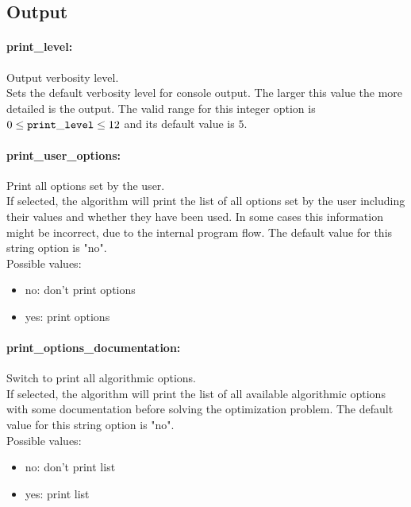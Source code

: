 \subsection{Output}

\paragraph{print\_level:}\label{sec:print_level} Output verbosity level. $\;$ \\
 Sets the default verbosity level for console
output. The larger this value the more detailed
is the output. The valid range for this integer option is
$0 \le {\tt print\_level } \le 12$
and its default value is $5$.


\paragraph{print\_user\_options:}\label{sec:print_user_options} Print all options set by the user. $\;$ \\
 If selected, the algorithm will print the list of
all options set by the user including their
values and whether they have been used.  In some
cases this information might be incorrect, due to
the internal program flow.
The default value for this string option is "no".
\\ 
Possible values:
\begin{itemize}
   \item no: don't print options
   \item yes: print options
\end{itemize}

\paragraph{print\_options\_documentation:}\label{sec:print_options_documentation} Switch to print all algorithmic options. $\;$ \\
 If selected, the algorithm will print the list of
all available algorithmic options with some
documentation before solving the optimization
problem.
The default value for this string option is "no".
\\ 
Possible values:
\begin{itemize}
   \item no: don't print list
   \item yes: print list
\end{itemize}

